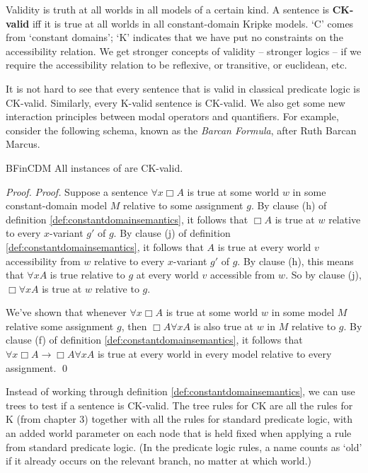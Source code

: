 Validity is truth at all worlds in all models of a certain kind. A sentence is
\textbf{CK-valid} iff it is true at all worlds in all constant-domain Kripke
models. `C' comes from `constant domains'; `K' indicates that we have put no
constraints on the accessibility relation. We get stronger concepts of validity
-- stronger logics -- if we require the accessibility relation to be reflexive,
or transitive, or euclidean, etc.

It is not hard to see that every sentence that is valid in classical predicate
logic is CK-valid. Similarly, every K-valid sentence is CK-valid. We also get
some new interaction principles between modal operators and quantifiers. For
example, consider the following schema, known as the \emph{Barcan Formula},
after Ruth Barcan Marcus.
%

\begin{observation}{BFinCDM}
  All instances of  are CK-valid.
\end{observation}
\begin{proof}
  \emph{Proof.} Suppose a sentence $\forall x \Box A$ is true at some world $w$
  in some constant-domain model $M$ relative to some assignment $g$. By clause
  (h) of definition \ref{def:constantdomainsemantics}, it follows that $\Box A$
  is true at $w$ relative to every $x$-variant $g'$ of $g$. By clause (j) of
  definition \ref{def:constantdomainsemantics}, it follows that $A$ is true at
  every world $v$ accessibility from $w$ relative to every $x$-variant $g'$ of
  $g$. By clause (h), this means that $\forall x A$ is true relative to $g$ at
  every world $v$ accessible from $w$. So by clause (j), $\Box \forall x A$ is
  true at $w$ relative to $g$.

  We've shown that whenever $\forall x \Box A$ is true at some world $w$ in some
  model $M$ relative some assignment $g$, then $\Box A \forall x A$ is also true
  at $w$ in $M$ relative to $g$. By clause (f) of definition
  \ref{def:constantdomainsemantics}, it follows that
  $\forall x \Box A \to\Box A \forall x A$ is true at every world in every model
  relative to every assignment. \qed
\end{proof}

Instead of working through definition \ref{def:constantdomainsemantics}, we can
use trees to test if a sentence is CK-valid. The tree rules for CK are all the
rules for K (from chapter 3) together with all the rules for standard predicate
logic, with an added world parameter on each node that is held fixed when
applying a rule from standard predicate logic. (In the predicate logic rules, a
name counts as `old' if it already occurs on the relevant branch, no matter at which world.)

